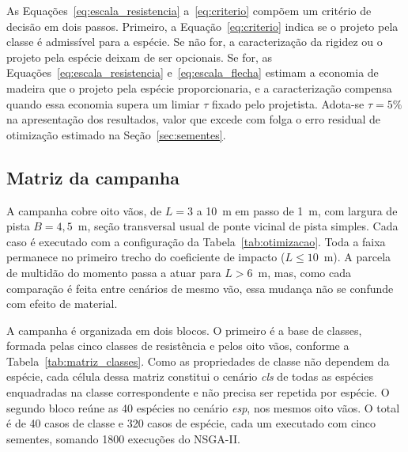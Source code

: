 As Equações~\eqref{eq:escala_resistencia} a~\eqref{eq:criterio} compõem um critério de decisão em dois passos. Primeiro, a Equação~\eqref{eq:criterio} indica se o projeto pela classe é admissível para a espécie. Se não for, a caracterização da rigidez ou o projeto pela espécie deixam de ser opcionais. Se for, as Equações~\eqref{eq:escala_resistencia} e~\eqref{eq:escala_flecha} estimam a economia de madeira que o projeto pela espécie proporcionaria, e a caracterização compensa quando essa economia supera um limiar $\tau$ fixado pelo projetista. Adota-se $\tau=5\%$ na apresentação dos resultados, valor que excede com folga o erro residual de otimização estimado na Seção~\ref{sec:sementes}.

\subsection{Matriz da campanha}\label{sec:campanha}

A campanha cobre oito vãos, de $L=3$ a 10~m em passo de 1~m, com largura de pista $B=4{,}5$~m, seção transversal usual de ponte vicinal de pista simples. Cada caso é executado com a configuração da Tabela~\ref{tab:otimizacao}. Toda a faixa permanece no primeiro trecho do coeficiente de impacto ($L\leq10$~m). A parcela de multidão do momento passa a atuar para $L>6$~m, mas, como cada comparação é feita entre cenários de mesmo vão, essa mudança não se confunde com efeito de material.

A campanha é organizada em dois blocos. O primeiro é a base de classes, formada pelas cinco classes de resistência e pelos oito vãos, conforme a Tabela~\ref{tab:matriz_classes}. Como as propriedades de classe não dependem da espécie, cada célula dessa matriz constitui o cenário \emph{cls} de todas as espécies enquadradas na classe correspondente e não precisa ser repetida por espécie. O segundo bloco reúne as 40 espécies no cenário \emph{esp}, nos mesmos oito vãos. O total é de 40 casos de classe e 320 casos de espécie, cada um executado com cinco sementes, somando 1800 execuções do NSGA-II.

